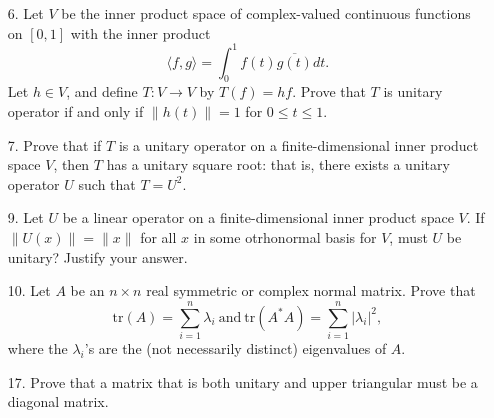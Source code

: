 \begin{enumerate}
    \item[6.] Let \(V\) be the inner product space of complex-valued continuous functions on \([0,1]\) with the inner product
    \[ \langle f,g \rangle = \int_0^1 f(t)\overline{g(t)} dt. \]
    Let \(h\in V\), and define \(T:V\to V\) by \(T(f) = hf\). Prove that \(T\) is unitary operator if and only if \(\lVert h(t) \rVert = 1\) for \(0\leq t \leq 1\). \vspace{3cm}
    \item[7.] Prove that if \(T\) is a unitary operator on a finite-dimensional inner product space \(V\), then \(T\) has a unitary square root: that is, there exists a unitary operator \(U\) such that \(T=U^2\).
    \item[9.] Let \(U\) be a linear operator on a finite-dimensional inner product space \(V\). If \(\lVert U(x)\rVert = \lVert x \rVert\) for all \(x\) in some otrhonormal basis for \(V\), must \(U\) be unitary? Justify your answer. \vspace{3cm}
    \item[10.] Let \(A\) be an \(n \times n\) real symmetric or complex normal matrix. Prove that
    \[ \text{tr}(A) = \sum_{i=1}^{n}\lambda_i \ \text{and} \ \text{tr}(A^*A) = \sum_{i=1}^{n}|\lambda_i|^2,\]
    where the \(\lambda_i\)'s are the (not necessarily distinct) eigenvalues of \(A\). \vspace{3cm}
    \item[17.] Prove that a matrix that is both unitary and upper triangular must be a diagonal matrix. \vspace{2cm}
\end{enumerate}